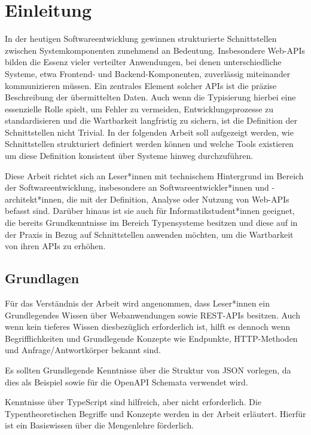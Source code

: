 
\section{Einleitung} 

In der heutigen Softwareentwicklung gewinnen strukturierte Schnittstellen zwischen Systemkomponenten zunehmend an Bedeutung. 
Insbesondere Web-APIs bilden die Essenz vieler verteilter Anwendungen, bei denen unterschiedliche Systeme, etwa Frontend- und Backend-Komponenten, 
zuverlässig miteinander kommunizieren müssen.
Ein zentrales Element solcher APIs ist die präzise Beschreibung der übermittelten Daten. 
Auch wenn die Typisierung hierbei eine essenzielle Rolle spielt, um Fehler zu vermeiden, 
Entwicklungsprozesse zu standardisieren und die Wartbarkeit langfristig zu sichern,
ist die Definition der Schnittstellen nicht Trivial.
In der folgenden Arbeit soll aufgezeigt werden, wie Schnittstellen strukturiert definiert werden können und welche
Tools existieren um diese Definition konsistent über Systeme hinweg durchzuführen.

Diese Arbeit richtet sich an Leser*innen mit technischem Hintergrund im Bereich der Softwareentwicklung, 
insbesondere an Softwareentwickler*innen und -architekt*innen, die mit der Definition, Analyse oder Nutzung von Web-APIs befasst sind.
Darüber hinaus ist sie auch für Informatikstudent*innen geeignet,
die bereits Grundkenntnisse im Bereich Typensysteme besitzen und diese auf in der Praxis in Bezug auf Schnittstellen anwenden möchten,
um die Wartbarkeit von ihren APIs zu erhöhen.


\subsection{Grundlagen}

Für das Verständnis der Arbeit wird angenommen, dass Leser*innen ein Grundlegendes Wissen über Webanwendungen sowie REST-APIs besitzen.
Auch wenn kein tieferes Wissen diesbezüglich erforderlich ist, hilft es dennoch wenn Begrifflichkeiten und Grundlegende Konzepte wie 
Endpunkte, HTTP-Methoden und Anfrage/Antwortkörper bekannt sind.

Es sollten Grundlegende Kenntnisse über die Struktur von JSON vorlegen, da dies als Beispiel sowie für die OpenAPI Schemata verwendet wird.

Kenntnisse über TypeScript sind hilfreich, aber nicht erforderlich. Die Typentheoretischen Begriffe und Konzepte werden in der Arbeit erläutert.
Hierfür ist ein Basiswissen über die Mengenlehre förderlich.

